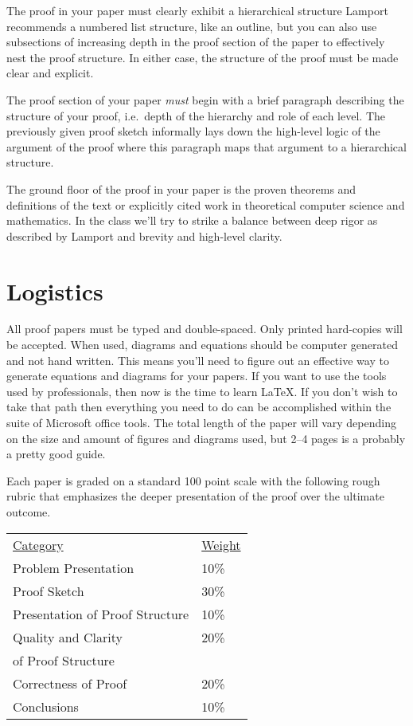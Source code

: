\documentclass{tufte-handout}
\begin{document}
The proof in your paper must clearly exhibit a hierarchical structure  Lamport recommends a numbered list structure, like an outline, but you can also use subsections of increasing depth in the proof section of the paper to effectively nest the proof structure. In either case, the structure of the proof must be made clear and explicit.

The proof section of your paper \textit{must} begin with a brief paragraph describing the structure of your proof, i.e.\ depth of the hierarchy and role of each level.  The previously given proof sketch informally lays down the high-level logic of the argument of the proof where this paragraph maps that argument to a hierarchical structure.

The ground floor of the proof in your paper is the proven theorems and definitions of the text or explicitly cited work in theoretical computer science and mathematics. In the class we'll try to strike a balance between deep rigor as described by Lamport and brevity and high-level clarity.

\section{Logistics}

All proof papers must be typed and double-spaced. Only printed hard-copies will be accepted. When used, diagrams and equations should be computer generated and not hand written. This means you'll need to figure out an effective way to generate equations and diagrams for your papers.  If you want to use the tools used by professionals, then now is the time to learn \LaTeX. If you don't wish to take that path then everything you need to do can be accomplished within the suite of Microsoft office tools. The total length of the paper will vary depending on the size and amount of figures and diagrams used, but 2--4 pages is a probably a pretty good guide.

Each paper is graded on a standard 100 point scale with the following rough rubric that emphasizes the deeper presentation of the proof over the ultimate outcome.

\begin{center}
  \begin{tabular}{ll}
    \underline{Category} & \underline{Weight} \\
      Problem Presentation & 10\% \\
      Proof Sketch & 30\% \\
      Presentation of Proof Structure & 10\% \\
      Quality and Clarity & 20\% \\
      of Proof Structure \\
      Correctness of Proof & 20\% \\
      Conclusions & 10\%
  \end{tabular}
\end{center}
\end{document}
